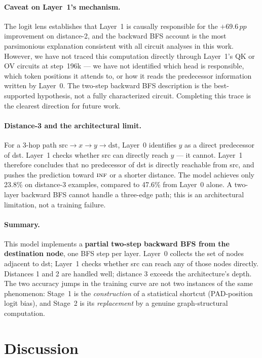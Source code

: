 \documentclass[11pt, a4paper]{article}
\newcommand{\INF}{\textsc{inf}}
\newcommand{\pp}{\,pp}  %
\begin{document}
\paragraph{Caveat on Layer~1's mechanism.}
The logit lens establishes that Layer~1 is causally responsible for the
$+69.6\pp$ improvement on distance-2, and the backward BFS account is
the most parsimonious explanation consistent with all circuit analyses
in this work.  However, we have not traced this computation directly
through Layer~1's QK or OV circuits at step~196k --- we have not
identified which head is responsible, which token positions it attends
to, or how it reads the predecessor information written by Layer~0.
The two-step backward BFS description is the best-supported hypothesis,
not a fully characterized circuit.  Completing this trace is the
clearest direction for future work.

\paragraph{Distance-3 and the architectural limit.}
For a 3-hop path $\mathrm{src} \to x \to y \to \mathrm{dst}$, Layer~0
identifies $y$ as a direct predecessor of dst.  Layer~1 checks whether
src can directly reach $y$ --- it cannot.  Layer~1 therefore concludes
that no predecessor of dst is directly reachable from src, and pushes
the prediction toward $\INF$ or a shorter distance.  The model achieves
only 23.8\% on distance-3 examples, compared to 47.6\% from Layer~0
alone.  A two-layer backward BFS cannot handle a three-edge path; this
is an architectural limitation, not a training failure.

\paragraph{Summary.}
This model implements a \textbf{partial two-step backward BFS from the
destination node}, one BFS step per layer.  Layer~0 collects the set of
nodes adjacent to dst; Layer~1 checks whether src can reach any of
those nodes directly.  Distances 1 and 2 are handled well; distance 3
exceeds the architecture's depth.  The two accuracy jumps in the
training curve are not two instances of the same phenomenon: Stage~1
is the \emph{construction} of a statistical shortcut (PAD-position
logit bias), and Stage~2 is its \emph{replacement} by a genuine
graph-structural computation.

\section{Discussion}
\label{sec:discussion}
\end{document}
